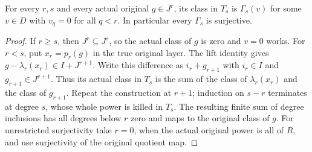 \begin{lemma}
\label{hir:relative-normal-actual-power-lift-truncation-tail-surjectivity}
\leanok
For every $r,s$ and every actual original $g\in J^r$, its class in
$T_s$ is $\Gamma_s(v)$ for some $v\in D$ with $v_q=0$ for all $q<r$.
In particular every $\Gamma_s$ is surjective.
\end{lemma}
\begin{proof}
If $r\geq s$, then $J^r\subseteq J^s$, so the actual class of $g$ is
zero and $v=0$ works. For $r<s$, put $x_r=p_r(g)$ in the true original
layer. The lift identity gives
$g-\lambda_r(x_r)\in I+J^{r+1}$. Write this difference as
$i_r+g_{r+1}$ with $i_r\in I$ and $g_{r+1}\in J^{r+1}$. Thus its
actual class in $T_s$ is the sum of the class of $\lambda_r(x_r)$
and the class of $g_{r+1}$. Repeat the construction at $r+1$; induction
on $s-r$ terminates at degree $s$, whose whole power is killed in
$T_s$. The resulting finite sum of degree inclusions has all degrees
below $r$ zero and maps to the original class of $g$. For unrestricted
surjectivity take $r=0$, when the actual original power is all of $R$,
and use surjectivity of the original quotient map.
\end{proof}

